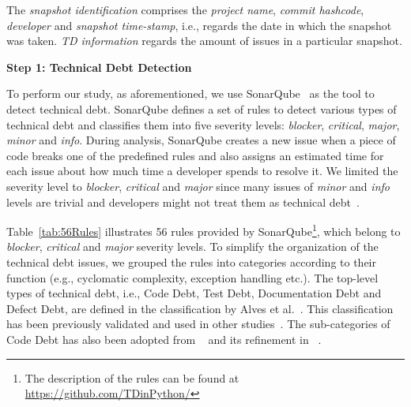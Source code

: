 \documentclass[sigconf,review]{acmart}
\begin{document}
\vspace{0.2cm}
\vspace{0.2cm}

The \textit{snapshot identification} comprises the \textit{project name}, \textit{commit hashcode}, \textit{developer}
and \textit{snapshot time-stamp}, i.e., regards the date in which the snapshot was taken.
\textit{TD information} regards the amount of issues in a particular snapshot.


\vspace{0.2cm}
\noindent
\textbf{Step 1: Technical Debt Detection}

To perform our study, as aforementioned, we use SonarQube~\cite{SonarQube} as the tool to detect technical debt. 
SonarQube defines a set of rules to detect various types of technical debt and classifies them into five severity levels: \textit{blocker}, \textit{critical}, \textit{major}, \textit{minor} and \textit{info}. During analysis, SonarQube creates a new issue when a piece of code breaks one of the predefined rules and also assigns an estimated time for each issue about how much time a developer spends to resolve it. We limited the severity level to \textit{blocker}, \textit{critical} and \textit{major} since many issues of \textit{minor} and \textit{info} levels are trivial and developers might not treat them as technical debt~\cite{DigkasSANER2018}.

Table~\ref{tab:56Rules} illustrates 56 rules provided by SonarQube\footnote{The description of the rules can be found at \url{https://github.com/TDinPython/}}, which belong to \textit{blocker}, \textit{critical} and \textit{major} severity levels. To simplify the organization of the technical debt issues, we grouped the rules into categories according to their function (e.g., cyclomatic complexity, exception handling etc.). The top-level types of technical debt, i.e., Code Debt, Test Debt, Documentation Debt and Defect Debt, are defined in the classification by Alves et al.~\cite{ClassifyTD2014}. This classification has been previously validated and used in other studies~\cite{ClassifyTD1,MSR2016}. The sub-categories of Code Debt has also been adopted from ~\cite{ClassifyTD2014} and its refinement in ~\cite{MSR2016}.  
\end{document}
